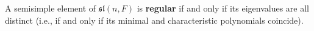A semisimple element of $\mathfrak{sl}(n, F)$ is \textbf{regular} if and only if its eigenvalues are all distinct (i.e., if and only if its minimal and characteristic polynomials coincide).
